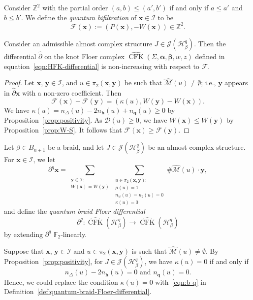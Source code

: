 \documentclass[11pt]{amsart}
\numberwithin{equation}{section}
\numberwithin{figure}{section}
\theoremstyle{definition}
\newcommand{\cD}{\mathcal{D}}
\newcommand{\cF}{\mathcal{F}}
\newcommand{\cH}{\mathcal{H}}
\newcommand{\cI}{\mathcal{I}}
\newcommand{\cJ}{\mathscr{J}}
\newcommand{\cM}{\mathcal{M}}
\newcommand{\bF}{\mathbb{F}}
\newcommand{\bZ}{\mathbb{Z}}
\newcommand{\ph}{\widehat{\partial}}
\DeclareMathOperator{\CFK}{CFK}
\newcommand{\cMh}{\widehat{\cM}}
\newcommand{\CFKh}{\widehat{\CFK}}
\newcommand{\as}{\boldsymbol{\alpha}}
\newcommand{\bs}{\boldsymbol{\beta}}
\newcommand{\hs}{\boldsymbol{h}}
\newcommand{\qs}{\boldsymbol{q}}
\newcommand{\xs}{\boldsymbol{x}}
\newcommand{\ys}{\boldsymbol{y}}
\begin{document}
\begin{defn}
    Consider $\bZ^2$ with the partial order $(a,b) \le (a',b')$ if and only if $a \le a'$ and $b \le b'$. We define the \emph{quantum bifiltration} of $\xs \in \cI$ to be
    \[
    \cF(\xs) := (P(\xs), -W(\xs)) \in \bZ^2.
    \]
\end{defn}

\begin{prop}\label{prop:filtration}
    Consider an admissible almost complex structure $J \in \cJ(\cH^q_\beta)$. Then the differential $\ph$ on the knot Floer complex $\CFKh(\Sigma, \as, \bs, w, z)$ defined in equation~\eqref{eqn:HFK-differential} is non-increasing with respect to $\cF$.
\end{prop}

\begin{proof}
    Let $\xs$, $\ys \in \cI$, and $u \in \pi_2(\xs,\ys)$ be such that $\cMh(u) \neq \emptyset$; i.e., $\ys$ appears in $\ph \xs$ with a non-zero coefficient. Then
    \[
    \cF(\xs) - \cF(\ys) = (\kappa(u), W(\ys) - W(\xs)). 
    \]
    We have $\kappa(u) = n_\Delta(u) - 2n_{\hs}(u) + n_{\qs}(u) \ge 0$ by Proposition~\ref{prop:positivity}. As $\cD(u) \ge 0$, we have $W(\xs) \le W(\ys)$ by Proposition~\ref{prop:W-S}. It follows that $\cF(\xs) \ge \cF(\ys)$.
\end{proof}

\begin{defn}\label{def:quantum-braid-Floer-differential}
    Let $\beta \in B_{n+1}$ be a braid, and let $J \in \cJ(\cH^q_\beta)$ be an almost complex structure. For $\xs \in \cI$, we let
    \[
    \partial^q \xs = \sum_{\substack{\ys \in \cI: \\ W(\xs) = W(\ys)}} \sum_{\substack{u \in \pi_2(\xs,\ys):\\ \mu(u)=1 \\ n_w(u) = n_z(u) = 0 \\ \kappa(u) = 0}} \#\cMh(u) \cdot \ys,
    \]
    and define the \emph{quantum braid Floer differential}
    \[
    \partial^q \colon \CFKh(\cH^q_\beta) \to \CFKh(\cH^q_\beta)
    \]
    by extending $\partial^q$ $\bF_2$-linearly.
\end{defn}

\begin{rmk}
    Suppose that $\xs$, $\ys \in \cI$ and $u \in \pi_2(\xs,\ys)$ is such that $\cMh(u) \neq \emptyset$. By Proposition~\ref{prop:positivity}, for $J \in \cJ(\cH_\beta^q)$, we have $\kappa(u) = 0$ if and only if
    \begin{equation}\label{eqn:b-q}
        n_\Delta(u) - 2n_{\hs}(u) = 0 \text{ and } n_{\qs}(u) = 0.
    \end{equation}
    Hence, we could replace the condition $\kappa(u) = 0$ with~\eqref{eqn:b-q} in Definition~\ref{def:quantum-braid-Floer-differential}.
\end{rmk}
\end{document}
